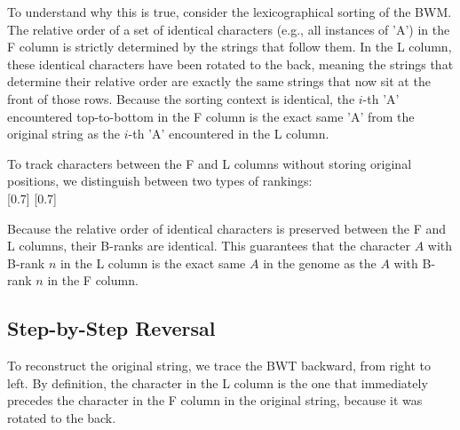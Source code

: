 To understand why this is true, consider the lexicographical sorting of the BWM. The relative order of a set of identical characters (e.g., all instances of 'A') in the F column is strictly determined by the strings that follow them. In the L column, these identical characters have been rotated to the back, meaning the strings that determine their relative order are exactly the same strings that now sit at the front of those rows. Because the sorting context is identical, the $i$-th 'A' encountered top-to-bottom in the F column is the exact same 'A' from the original string as the $i$-th 'A' encountered in the L column.

To track characters between the F and L columns without storing original positions, we distinguish between two types of rankings:\\

[0.7]
[0.7]


Because the relative order of identical characters is preserved between the F and L columns, their B-ranks are identical. This guarantees that the character $A$ with B-rank $n$ in the L column is the exact same $A$ in the genome as the $A$ with B-rank $n$ in the F column.

\subsection{Step-by-Step Reversal}
To reconstruct the original string, we trace the BWT backward, from right to left. By definition, the character in the L column is the one that immediately precedes the character in the F column in the original string, because it was rotated to the back.



